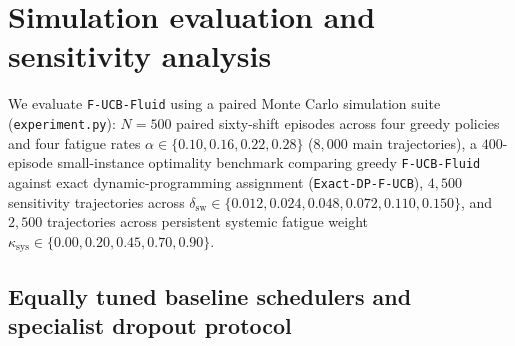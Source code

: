 \documentclass[11pt]{article}
\begin{document}
\section{Simulation evaluation and sensitivity analysis}\label{sec:experiments}

We evaluate \texttt{F-UCB-Fluid} using a paired Monte Carlo simulation suite (\texttt{experiment.\linebreak[0]py}): $N=500$ paired sixty-shift episodes across four greedy policies and four fatigue rates $\alpha \in \{0.10,\allowbreak 0.16,\allowbreak 0.22,\allowbreak 0.28\}$ ($8{,}000$ main trajectories), a $400$-episode small-instance optimality benchmark comparing greedy \texttt{F-UCB-Fluid} against exact dynamic-programming assignment (\texttt{Exact-DP-F-UCB}), $4{,}500$ sensitivity trajectories across $\delta_{\mathrm{sw}} \allowbreak \in \{0.012,\allowbreak 0.024,\allowbreak 0.048,\allowbreak 0.072,\allowbreak 0.110,\allowbreak 0.150\}$, and $2{,}500$ trajectories across persistent systemic fatigue weight $\kappa_{\mathrm{sys}} \allowbreak \in \{0.00,\allowbreak 0.20,\allowbreak 0.45,\allowbreak 0.70,\allowbreak 0.90\}$.

\subsection{Equally tuned baseline schedulers and specialist dropout protocol}
\end{document}
